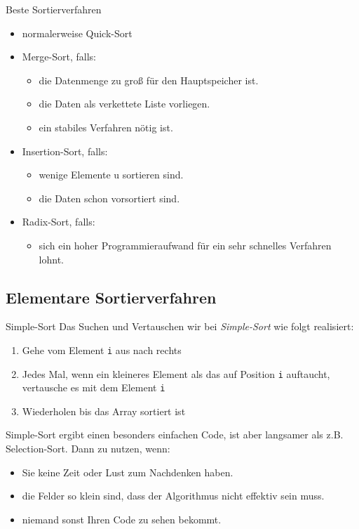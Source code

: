 \begin{bonus}{Beste Sortierverfahren}
    \begin{itemize}
        \item normalerweise Quick-Sort
        \item Merge-Sort, falls:
              \begin{itemize}
                  \item die Datenmenge zu groß für den Hauptspeicher ist.
                  \item die Daten als verkettete Liste vorliegen.
                  \item ein stabiles Verfahren nötig ist.
              \end{itemize}
        \item Insertion-Sort, falls:
              \begin{itemize}
                  \item wenige Elemente u sortieren sind.
                  \item die Daten schon vorsortiert sind.
              \end{itemize}
        \item Radix-Sort, falls:
              \begin{itemize}
                  \item sich ein hoher Programmieraufwand für ein sehr schnelles Verfahren lohnt.
              \end{itemize}
    \end{itemize}
\end{bonus}

\subsection{Elementare Sortierverfahren}

\begin{algo}{Simple-Sort}
    Das Suchen und Vertauschen wir bei \emph{Simple-Sort} wie folgt realisiert:
    \begin{enumerate}
        \item Gehe vom Element \texttt{i} aus nach rechts
        \item Jedes Mal, wenn ein kleineres Element als das auf Position \texttt{i} auftaucht, vertausche es mit dem Element \texttt{i}
        \item Wiederholen bis das Array sortiert ist
    \end{enumerate}

    Simple-Sort ergibt einen besonders einfachen Code, ist aber langsamer als z.B. Selection-Sort.
    Dann zu nutzen, wenn:
    \begin{itemize}
        \item Sie keine Zeit oder Lust zum Nachdenken haben.
        \item die Felder so klein sind, dass der Algorithmus nicht effektiv sein muss.
        \item niemand sonst Ihren Code zu sehen bekommt.
    \end{itemize}
\end{algo}

